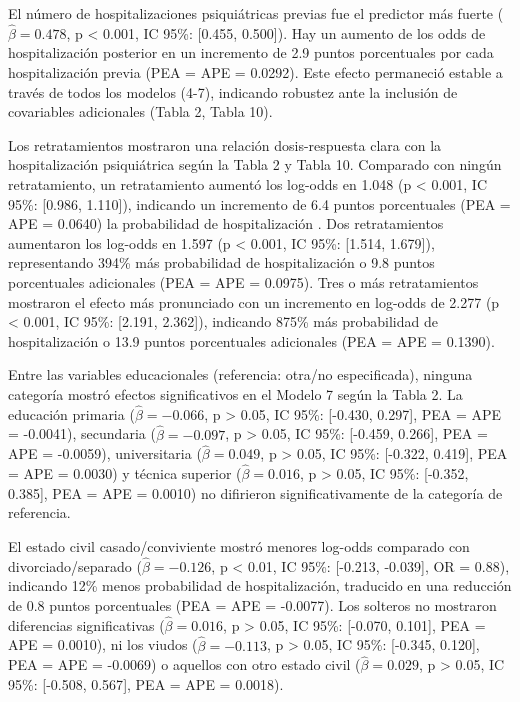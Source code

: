 \documentclass[
  spanish,
  10pt,
]{article}
\begin{document}
El número de hospitalizaciones psiquiátricas previas fue el predictor
más fuerte (\(\hat{\beta} = 0.478\), p \textless{} 0.001, IC 95\%:
{[}0.455, 0.500{]}). Hay un aumento de los odds de hospitalización
posterior en un incremento de 2.9 puntos porcentuales por cada
hospitalización previa (PEA = APE = 0.0292). Este efecto permaneció
estable a través de todos los modelos (4-7), indicando robustez ante la
inclusión de covariables adicionales (Tabla 2, Tabla 10).

Los retratamientos mostraron una relación dosis-respuesta clara con la
hospitalización psiquiátrica según la Tabla 2 y Tabla 10. Comparado con
ningún retratamiento, un retratamiento aumentó los log-odds en 1.048 (p
\textless{} 0.001, IC 95\%: {[}0.986, 1.110{]}), indicando un incremento
de 6.4 puntos porcentuales (PEA = APE = 0.0640) la probabilidad de
hospitalización . Dos retratamientos aumentaron los log-odds en 1.597 (p
\textless{} 0.001, IC 95\%: {[}1.514, 1.679{]}), representando 394\% más
probabilidad de hospitalización o 9.8 puntos porcentuales adicionales
(PEA = APE = 0.0975). Tres o más retratamientos mostraron el efecto más
pronunciado con un incremento en log-odds de 2.277 (p \textless{} 0.001,
IC 95\%: {[}2.191, 2.362{]}), indicando 875\% más probabilidad de
hospitalización o 13.9 puntos porcentuales adicionales (PEA = APE =
0.1390).

Entre las variables educacionales (referencia: otra/no especificada),
ninguna categoría mostró efectos significativos en el Modelo 7 según la
Tabla 2. La educación primaria (\(\hat{\beta} = -0.066\), p
\textgreater{} 0.05, IC 95\%: {[}-0.430, 0.297{]}, PEA = APE = -0.0041),
secundaria (\(\hat{\beta} = -0.097\), p \textgreater{} 0.05, IC 95\%:
{[}-0.459, 0.266{]}, PEA = APE = -0.0059), universitaria
(\(\hat{\beta} = 0.049\), p \textgreater{} 0.05, IC 95\%: {[}-0.322,
0.419{]}, PEA = APE = 0.0030) y técnica superior
(\(\hat{\beta} = 0.016\), p \textgreater{} 0.05, IC 95\%: {[}-0.352,
0.385{]}, PEA = APE = 0.0010) no difirieron significativamente de la
categoría de referencia.

El estado civil casado/conviviente mostró menores log-odds comparado con
divorciado/separado (\(\hat{\beta} = -0.126\), p \textless{} 0.01, IC
95\%: {[}-0.213, -0.039{]}, OR = 0.88), indicando 12\% menos
probabilidad de hospitalización, traducido en una reducción de 0.8
puntos porcentuales (PEA = APE = -0.0077). Los solteros no mostraron
diferencias significativas (\(\hat{\beta} = 0.016\), p \textgreater{}
0.05, IC 95\%: {[}-0.070, 0.101{]}, PEA = APE = 0.0010), ni los viudos
(\(\hat{\beta} = -0.113\), p \textgreater{} 0.05, IC 95\%: {[}-0.345,
0.120{]}, PEA = APE = -0.0069) o aquellos con otro estado civil
(\(\hat{\beta} = 0.029\), p \textgreater{} 0.05, IC 95\%: {[}-0.508,
0.567{]}, PEA = APE = 0.0018).
\end{document}
